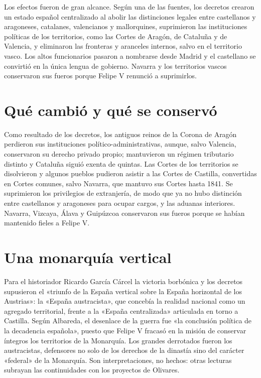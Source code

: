 \documentclass{book}
\begin{document}

Los efectos fueron de gran alcance. Según una de las fuentes, los decretos crearon un estado español centralizado al abolir las distinciones legales entre castellanos y aragoneses, catalanes, valencianos y mallorquines, suprimieron las instituciones políticas de los territorios, como las Cortes de Aragón, de Cataluña y de Valencia, y eliminaron las fronteras y aranceles internos, salvo en el territorio vasco. Los altos funcionarios pasaron a nombrarse desde Madrid y el castellano se convirtió en la única lengua de gobierno. Navarra y los territorios vascos conservaron sus fueros porque Felipe V renunció a suprimirlos.


\section{Qué cambió y qué se conservó}

Como resultado de los decretos, los antiguos reinos de la Corona de Aragón perdieron sus instituciones político-administrativas, aunque, salvo Valencia, conservaron su derecho privado propio; mantuvieron un régimen tributario distinto y Cataluña siguió exenta de quintas. Las Cortes de los territorios se disolvieron y algunos pueblos pudieron asistir a las Cortes de Castilla, convertidas en Cortes comunes, salvo Navarra, que mantuvo sus Cortes hasta 1841. Se suprimieron los privilegios de extranjería, de modo que ya no hubo distinción entre castellanos y aragoneses para ocupar cargos, y las aduanas interiores. Navarra, Vizcaya, Álava y Guipúzcoa conservaron sus fueros porque se habían mantenido fieles a Felipe V.


\section{Una monarquía vertical}

Para el historiador Ricardo García Cárcel la victoria borbónica y los decretos supusieron el «triunfo de la España vertical sobre la España horizontal de los Austrias»: la «España austracista», que concebía la realidad nacional como un agregado territorial, frente a la «España centralizada» articulada en torno a Castilla. Según Albareda, el desenlace de la guerra fue «la conclusión política de la decadencia española», puesto que Felipe V fracasó en la misión de conservar íntegros los territorios de la Monarquía. Los grandes derrotados fueron los austracistas, defensores no solo de los derechos de la dinastía sino del carácter «federal» de la Monarquía. Son interpretaciones, no hechos: otras lecturas subrayan las continuidades con los proyectos de Olivares.
\end{document}
